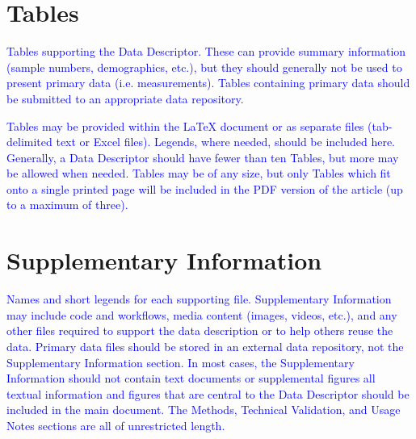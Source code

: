 \documentclass[english,11pt]{article}
\begin{document}
\section*{Tables}

\textcolor{blue}{Tables supporting the Data Descriptor. These can provide summary information
(sample numbers, demographics, etc.), but they should generally not
be used to present primary data (i.e. measurements). Tables containing
primary data should be submitted to an appropriate data repository. }

\textcolor{blue}{Tables may be provided within the \LaTeX{} document or as separate
files (tab-delimited text or Excel files). Legends, where needed,
should be included here. Generally, a Data Descriptor should have
fewer than ten Tables, but more may be allowed when needed. Tables
may be of any size, but only Tables which fit onto a single printed
page will be included in the PDF version of the article (up to a maximum
of three). }


\section*{Supplementary Information}

\textcolor{blue}{Names and short legends for each supporting file. Supplementary Information
may include code and workflows, media content (images, videos, etc.),
and any other files required to support the data description or to
help others reuse the data. Primary data files should be stored in
an external data repository, not the Supplementary Information section.
In most cases, the Supplementary Information should not contain text
documents or supplemental figures \textendash{} all textual information
and figures that are central to the Data Descriptor should be included
in the main document. The Methods, Technical Validation, and Usage
Notes sections are all of unrestricted length. }


{}

\end{document}

